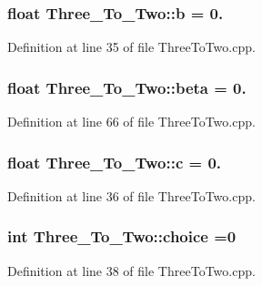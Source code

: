 \subsubsection[{\texorpdfstring{b}{b}}]{\setlength{\rightskip}{0pt plus 5cm}float Three\+\_\+\+To\+\_\+\+Two\+::b = 0.}\hypertarget{class_three___to___two_a4859d8dc45f60e772c55ab2923bab71c}{}\label{class_three___to___two_a4859d8dc45f60e772c55ab2923bab71c}


Definition at line 35 of file Three\+To\+Two.\+cpp.

\subsubsection[{\texorpdfstring{beta}{beta}}]{\setlength{\rightskip}{0pt plus 5cm}float Three\+\_\+\+To\+\_\+\+Two\+::beta = 0.}\hypertarget{class_three___to___two_a36bafd8c3cf8db0e6ea4f6f936922e3d}{}\label{class_three___to___two_a36bafd8c3cf8db0e6ea4f6f936922e3d}


Definition at line 66 of file Three\+To\+Two.\+cpp.

\subsubsection[{\texorpdfstring{c}{c}}]{\setlength{\rightskip}{0pt plus 5cm}float Three\+\_\+\+To\+\_\+\+Two\+::c = 0.}\hypertarget{class_three___to___two_aaf40e46b50333549d03205a22974fce0}{}\label{class_three___to___two_aaf40e46b50333549d03205a22974fce0}


Definition at line 36 of file Three\+To\+Two.\+cpp.

\subsubsection[{\texorpdfstring{choice}{choice}}]{\setlength{\rightskip}{0pt plus 5cm}int Three\+\_\+\+To\+\_\+\+Two\+::choice =0}\hypertarget{class_three___to___two_abfb1f1c097808c8faf3f6cb28911491d}{}\label{class_three___to___two_abfb1f1c097808c8faf3f6cb28911491d}


Definition at line 38 of file Three\+To\+Two.\+cpp.


